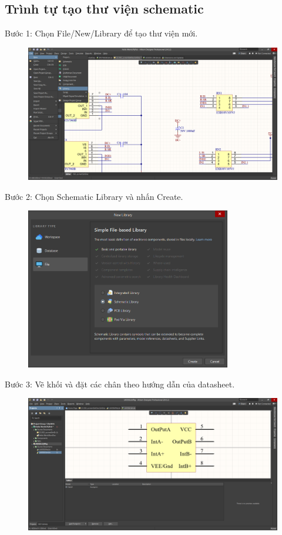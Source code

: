             \subsection{Trình tự tạo thư viện schematic}
                Bước 1: Chọn File/New/Library để tạo thư viện mới.
                \begin{figure}[H]
                    \centering
                    \includegraphics[width=1\textwidth]{pictures/ch3.1.png}
                \end{figure}
                Bước 2: Chọn Schematic Library và nhấn Create.
                \begin{figure}[H]
                    \centering
                    \includegraphics[width=0.8\textwidth]{pictures/ch3.2.png}
                \end{figure}
                Bước 3: Vẽ khối và đặt các chân theo hướng dẫn của datasheet.
                \begin{figure}[H]
                    \centering
                    \includegraphics[width=1\textwidth]{pictures/ch3.3.png}
                \end{figure}
